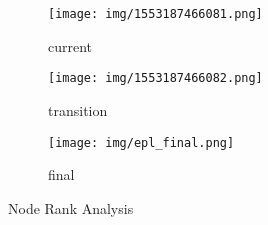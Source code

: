 \begin{figure*}[ht]
\centering
\begin{adjustbox}{minipage=\linewidth,scale=1}
\begin{subfigure}{.33\textwidth}
\texttt{[image: img/1553187466081.png]}
\caption{current}
\label{fig:nra_curr}
\end{subfigure}%
\begin{subfigure}{.33\textwidth}
\texttt{[image: img/1553187466082.png]}
\caption{transition}
\label{fig:nra_trans}
\end{subfigure}%
\begin{subfigure}{.33\textwidth}
\texttt{[image: img/epl\_final.png]}
\caption{final}
\label{fig:nra_fin}
\end{subfigure}%
\caption{Node Rank Analysis}
\label{fig:nr_all}
\end{adjustbox}
\end{figure*} 
